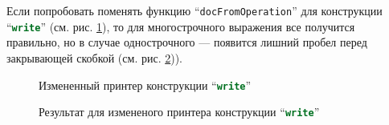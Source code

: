 Если попробовать поменять функцию “\lstinline[language=Haskell]{docFromOperation}” для конструкции “\lstinline[language=pascal]{write}” (см. рис. \ref{fig:lHughesWriteChange}),
то для многострочного выражения все получится правильно, но в случае однострочного --- появится лишний пробел перед закрывающей скобкой (см. рис. \ref{fig:lBadWriteEx})).

\begin{figure}[h!]
	
	\caption{Измененный принтер конструкции “\lstinline[language=pascal]{write}”}
	\label{fig:lHughesWriteChange}
\end{figure}

\begin{figure}[h!]
	
	\caption{Результат для измененого принтера конструкции “\lstinline[language=pascal]{write}”}
	\label{fig:lBadWriteEx}
\end{figure}
